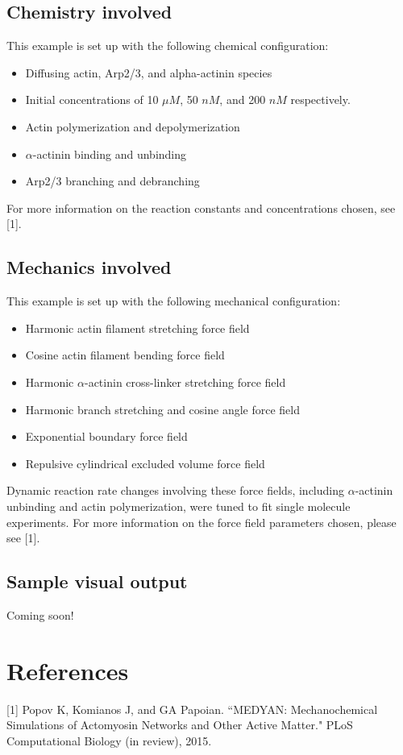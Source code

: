 \documentclass[11pt, oneside]{article}   	%
\begin{document}
\subsection{Chemistry involved}

This example is set up with the following chemical configuration:

\begin{itemize}
\item Diffusing actin, Arp2/3, and alpha-actinin species
\item Initial concentrations of 10 $\mu M$, 50 $nM$, and 200 $nM$ respectively.
\item Actin polymerization and depolymerization
\item $\alpha$-actinin binding and unbinding
\item Arp2/3 branching and debranching

\end{itemize}

\noindent For more information on the reaction constants and concentrations chosen, see [1].

\subsection{Mechanics involved}

This example is set up with the following mechanical configuration:

\begin{itemize}
\item Harmonic actin filament stretching force field
\item Cosine actin filament bending force field
\item Harmonic $\alpha$-actinin cross-linker stretching force field
\item Harmonic branch stretching and cosine angle force field
\item Exponential boundary force field
\item Repulsive cylindrical excluded volume force field
\end{itemize}

\noindent Dynamic reaction rate changes involving these force fields, including $\alpha$-actinin unbinding and actin polymerization, were tuned to fit single molecule experiments.\newline\newline
\noindent For more information on the force field parameters chosen, please see [1]. 

\subsection{Sample visual output}

Coming soon!

\section{References}

[1] Popov K, Komianos J, and GA Papoian. ``MEDYAN: Mechanochemical Simulations 
\indent of Actomyosin Networks and Other Active Matter." PLoS Computational Biology (in 
\indent review), 2015.
\end{document}
